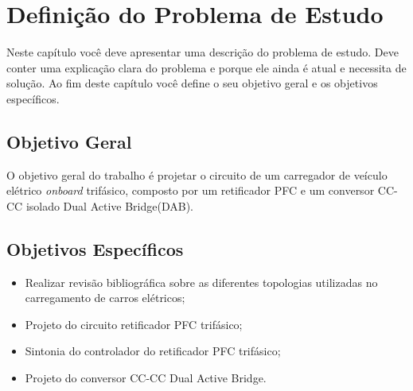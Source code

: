\chapter{Definição do Problema de Estudo}
Neste capítulo você deve apresentar uma descrição do problema de estudo.
Deve conter uma explicação clara do problema e porque ele ainda é atual e necessita de solução.
Ao fim deste capítulo você define o seu objetivo geral e os objetivos específicos. 


\section{Objetivo Geral}
O objetivo geral do trabalho é projetar o circuito de um carregador de veículo elétrico \textit{onboard} trifásico, composto por um retificador PFC e um conversor CC-CC isolado Dual Active Bridge(DAB).
\section{Objetivos Específicos}
\begin{itemize}
    \item Realizar revisão bibliográfica sobre as diferentes topologias utilizadas no carregamento de carros elétricos;
    \item Projeto do circuito retificador PFC trifásico;
    \item Sintonia do controlador do retificador PFC trifásico;
    \item Projeto do conversor CC-CC Dual Active Bridge.
\end{itemize}